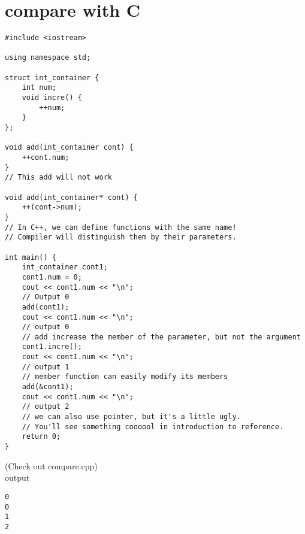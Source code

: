\documentclass{article}
\begin{document}
\section{compare with C}
\begin{lstlisting}
#include <iostream>

using namespace std;

struct int_container {
    int num;
    void incre() {
        ++num;
    }
};

void add(int_container cont) {
    ++cont.num;
}
// This add will not work

void add(int_container* cont) {
    ++(cont->num);
}
// In C++, we can define functions with the same name!
// Compiler will distinguish them by their parameters.

int main() {
    int_container cont1;
    cont1.num = 0;
    cout << cont1.num << "\n";
    // Output 0
    add(cont1);
    cout << cont1.num << "\n";
    // output 0
    // add increase the member of the parameter, but not the argument
    cont1.incre();
    cout << cont1.num << "\n";
    // output 1
    // member function can easily modify its members
    add(&cont1);
    cout << cont1.num << "\n";
    // output 2
    // we can also use pointer, but it's a little ugly.
    // You'll see something coooool in introduction to reference.
    return 0;
}
\end{lstlisting}
(Check out compare.cpp)\\
output
\begin{lstlisting}
0
0
1
2
\end{lstlisting}
\end{document}
